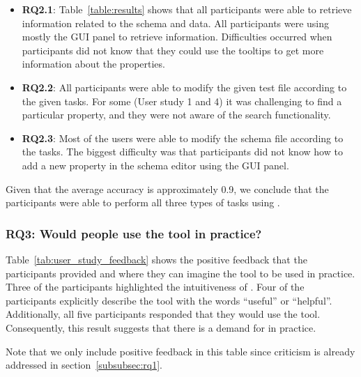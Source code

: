 \begin{itemize}
    \item \textbf{RQ2.1}: Table~\ref{table:results} shows that all
    participants were able to retrieve information related to the schema and data.
    All participants were using mostly the GUI panel to retrieve information.
    Difficulties occurred when participants did not know that they could use the tooltips to get more information about the properties.
    \item \textbf{RQ2.2}: All participants were able to modify the given test file according to the given tasks.
    For some (User study 1 and 4) it was challenging to find a particular property, and they were not aware of the search functionality.
    \item \textbf{RQ2.3}: Most of the users were able to modify the schema file according to the tasks.
    The biggest difficulty was that participants did not know how to add a new property in the schema editor using the GUI panel.
\end{itemize}

Given that the average accuracy is approximately 0.9, we conclude that the participants were able to perform all three types of tasks using \toolname{}.

\subsubsection{\textbf{RQ3:} Would people use the tool in practice?} %
Table~\ref{tab:user_study_feedback} shows the positive feedback that the participants provided and where they can imagine the tool to be used in practice.
Three of the participants highlighted the intuitiveness of \toolname.
Four of the participants explicitly describe the tool with the words ``useful'' or ``helpful''.
Additionally, all five participants responded that they would use the tool.
Consequently, this result suggests that there is a demand for \toolname{} in practice.

Note that we only include positive feedback in this table since criticism is already addressed in section~\ref{subsubsec:rq1}.



